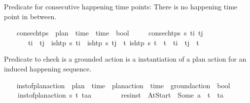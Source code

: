 \begin{isabellebody}
\begin{isamarkuptext}%
Predicate for consecutive happening time points: There is no happening 
  time point in between.%
\end{isamarkuptext}\isamarkuptrue%
\ \ \isamarkupfalse%
\ consec{\isacharunderscore}{\kern0pt}htps\ {\isacharcolon}{\kern0pt}{\isacharcolon}{\kern0pt}\ {\isachardoublequoteopen}plan\ {\isasymRightarrow}\ time\ {\isasymRightarrow}\ time\ {\isasymRightarrow}\ bool{\isachardoublequoteclose}\ \isanewline
\ \ \ \ {\isachardoublequoteopen}consec{\isacharunderscore}{\kern0pt}htps\ {\isasympi}s\ t\isactrlsub i\ t\isactrlsub j\ \isanewline
\ \ \ \ \ \ {\isasymlongleftrightarrow}\ {\isacharparenleft}{\kern0pt}t\isactrlsub i\ {\isacharless}{\kern0pt}\ t\isactrlsub j\ {\isasymand}\ is{\isacharunderscore}{\kern0pt}htp\ {\isasympi}s\ t\isactrlsub i\ {\isasymand}\ is{\isacharunderscore}{\kern0pt}htp\ {\isasympi}s\ t\isactrlsub j\ {\isasymand}\ {\isacharparenleft}{\kern0pt}{\isasymforall}t{\isachardot}{\kern0pt}\ is{\isacharunderscore}{\kern0pt}htp\ {\isasympi}s\ t\ {\isasymlongrightarrow}\ t\ {\isasymle}\ t\isactrlsub i\ {\isasymor}\ t\isactrlsub j\ {\isasymle}\ t{\isacharparenright}{\kern0pt}{\isacharparenright}{\kern0pt}{\isachardoublequoteclose}%
\begin{isamarkuptext}%
Predicate to check is a grounded action is a instantiation of a plan action 
  for an induced happening sequence.%
\end{isamarkuptext}\isamarkuptrue%
\ \ \isamarkupfalse%
\ inst{\isacharunderscore}{\kern0pt}of{\isacharunderscore}{\kern0pt}plan{\isacharunderscore}{\kern0pt}action\ {\isacharcolon}{\kern0pt}{\isacharcolon}{\kern0pt}\ {\isachardoublequoteopen}plan\ {\isasymRightarrow}\ time\ {\isasymtimes}\ plan{\isacharunderscore}{\kern0pt}action\ {\isasymRightarrow}\ time\ {\isasymtimes}\ ground{\isacharunderscore}{\kern0pt}action\ {\isasymRightarrow}\ bool{\isachardoublequoteclose}\ \isanewline
\ \ \ \ {\isachardoublequoteopen}inst{\isacharunderscore}{\kern0pt}of{\isacharunderscore}{\kern0pt}plan{\isacharunderscore}{\kern0pt}action\ {\isasympi}s\ {\isacharparenleft}{\kern0pt}t\isactrlsub {\isasympi}{\isacharcomma}{\kern0pt}{\isasympi}{\isacharparenright}{\kern0pt}\ {\isacharparenleft}{\kern0pt}t\isactrlsub a{\isacharcomma}{\kern0pt}a{\isacharparenright}{\kern0pt}\ {\isasymlongleftrightarrow}\ {\isacharparenleft}{\kern0pt}\isanewline
\ \ \ \ \ \ {\isacharparenleft}{\kern0pt}res{\isacharunderscore}{\kern0pt}inst\ {\isasympi}\ At{\isacharunderscore}{\kern0pt}Start\ {\isacharequal}{\kern0pt}\ Some\ a\ {\isasymand}\ t\isactrlsub {\isasympi}\ {\isacharequal}{\kern0pt}\ t\isactrlsub a{\isacharparenright}{\kern0pt}\isanewline

\end{isabellebody}
